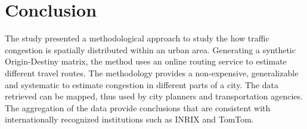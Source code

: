 \documentclass[a4paper]{jpconf}
\begin{document}
	\section{Conclusion} %
	The study presented a methodological approach to study the how traffic congestion is spatially distributed within an urban area. Generating a synthetic Origin-Destiny matrix, the method uses an online routing service to estimate different travel routes. The methodology provides a non-expensive, generalizable and systematic to estimate congestion in different parts of a city. The data retrieved can be mapped, thus used by city planners and transportation agencies. The aggregation of the data provide conclusions that are consistent with internationally recognized institutions such as INRIX and TomTom. 
	
	
	\printbibliography %
	
	
\end{document}
